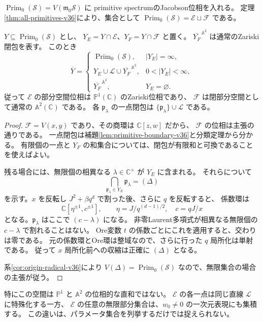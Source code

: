 $\operatorname{Prim}_0(\mathcal S)=V(\mathfrak m_0\mathcal S)$ に
primitive spectrumのJacobson位相を入れる。
定理\ref{thm:all-primitives-v36}により、集合として
$\operatorname{Prim}_0(\mathcal S)=\mathscr E\sqcup\mathscr F$ である。

\begin{theorem}[原点fiber内の任意の集合の閉包]
\label{thm:primitive-closure-v36}
$Y\subseteq\operatorname{Prim}_0(\mathcal S)$ とし、
$Y_E=Y\cap\mathscr E$、$Y_F=Y\cap\mathscr F$ と置く。
$\overline{Y_F}^{\,\mathbb A^2}$ は通常のZariski閉包を表す。
このとき
\[
 \overline Y=
 \begin{cases}
  \operatorname{Prim}_0(\mathcal S),& |Y_E|=\infty,\\[2pt]
  Y_E\cup\mathscr L\cup\overline{Y_F}^{\,\mathbb A^2},
       &0<|Y_E|<\infty,\\[2pt]
  \overline{Y_F}^{\,\mathbb A^2},&Y_E=\varnothing.
 \end{cases}
\]
従って $\mathscr E$ の部分空間位相は
$\mathbb P^1(\mathbb C)$ のZariski位相であり、
$\mathscr F$ は閉部分空間として通常の $\mathbb A^2(\mathbb C)$ である。
各 $\mathfrak p_\lambda$ の一点閉包は
$\{\mathfrak p_\lambda\}\cup\mathscr L$ である。
\end{theorem}

\begin{proof}
$\mathscr F=V(x,y)$ であり、その商環は $\mathbb C[z,w]$ だから、
$\mathscr F$ の位相は主張の通りである。
一点閉包は補題\ref{lem:primitive-boundary-v36}と分類定理から分かる。
有限個の一点と $Y_F$ の和集合については、閉包が有限和と可換であることを使えばよい。

残る場合には、無限個の相異なる $\lambda\in\mathbb C^\times$ が $Y_E$ に含まれる。
それらについて
\[
 \bigcap_{\mathfrak p_\lambda\in Y_E}\mathfrak p_\lambda=(\Delta)
\]
を示す。$x$ を反転し $J^2+\beta q^d$ で割った後、さらに $q$ を反転すると、
係数環は
\[
 \mathbb C[\eta^{\pm1},c^{\pm1}],\qquad
 \eta=J/q^{(d-1)/2},\quad c=qJ/x
\]
となる。$\mathfrak p_\lambda$ はここで $(c-\lambda)$ になる。
非零Laurent多項式が相異なる無限個の $c-\lambda$ で割れることはない。
Ore変数 $t$ の係数ごとにこれを適用すると、交わりは零である。
元の係数環とOre環は整域なので、さらに行った $q$ 局所化は単射である。
従って $x$ 局所化前への収縮は正確に $(\Delta)$ となる。

系\ref{cor:origin-radical-v36}により
$V(\Delta)=\operatorname{Prim}_0(\mathcal S)$ なので、無限集合の場合の主張が従う。
\end{proof}

特にこの空間は $\mathbb P^1$ と $\mathbb A^2$ の位相的な直和ではない。
$\mathscr E$ の各一点は同じ直線 $\mathscr L$ に特殊化する一方、
$\mathscr E$ の任意の無限部分集合は、$w_0\ne0$ の一次元表現にも集積する。
この違いは、パラメータ集合を列挙するだけでは捉えられない。

